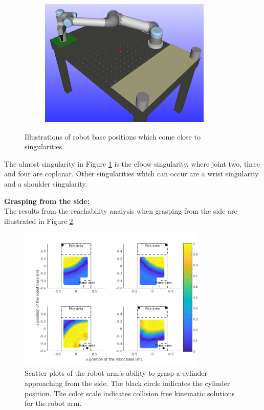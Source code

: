 \documentclass[../main.tex]{subfiles}
\begin{document}
\begin{figure}[H]
\begin{subfigure}{0.329\textwidth}
    \end{subfigure}%
    \begin{subfigure}{0.329\textwidth}
        \centering
        \includegraphics[width=0.9\textwidth]{figures/workcell_setup/singularity3.png}
    \end{subfigure}
    \caption{Illustrations of robot base positions which come close to singularities.}
    \label{fig:close2singularities}
\end{figure}
The almost singularity in Figure \ref{fig:close2singularities} is the elbow singularity, where joint two, three and four are coplanar. Other singularities which can occur are a wrist singularity and a shoulder singularity.

\textbf{Grasping from the side:}\\
The results from the reachability analysis when grasping from the side are illustrated in Figure \ref{fig:scatter_cylinder_side}. 

\begin{figure}[H]
    \centering
    \includegraphics[width=0.8\textwidth]{figures/workcell_setup/scatter_cylinder_side.png}
    \caption{Scatter plots of the robot arm's ability to grasp a cylinder approaching from the side. The black circle indicates the cylinder position. The color scale indicates collision free kinematic solutions for the robot arm.}
    \label{fig:scatter_cylinder_side}
\end{figure}
\end{document}
